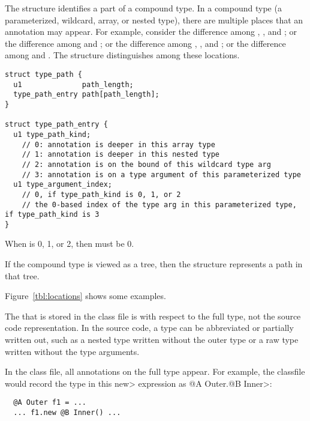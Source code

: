\documentclass[10pt]{article}
\newcommand{\preverbnegspace}{\vspace{-5pt}}
\begin{document}
The  structure identifies a part of a compound type.
In a compound type (a parameterized, wildcard, array, or nested type),
there are multiple places that an annotation may appear.
For example, consider the difference among
,
, and
;
or the difference among
 and
;
or the difference among 
,
, and
;
or the difference among 
 and
.
The  structure distinguishes among these locations.

\begin{Verbatim}
struct type_path {
  u1              path_length;
  type_path_entry path[path_length];
}

struct type_path_entry {
  u1 type_path_kind;
    // 0: annotation is deeper in this array type
    // 1: annotation is deeper in this nested type
    // 2: annotation is on the bound of this wildcard type arg
    // 3: annotation is on a type argument of this parameterized type
  u1 type_argument_index;
    // 0, if type_path_kind is 0, 1, or 2
    // the 0-based index of the type arg in this parameterized type, if type_path_kind is 3
}
\end{Verbatim}


When  is 0, 1, or 2, then
 must be 0.

If the compound type is viewed as a tree, then 
the  structure represents a path in that tree.

Figure~\ref{tbl:locations} shows some examples.

The  that is stored in the class file is with respect to the full type, not the
source code representation.  In the source code, a type can be abbreviated
or partially written out, such as a nested type written without the outer
type or a raw type written without the type arguments.

In the class file, all annotations on the full type appear.  For example,
the classfile would record the type in this \<new> expression as
\<@A Outer.@B Inner>:

\preverbnegspace
\begin{Verbatim}
  @A Outer f1 = ...
  ... f1.new @B Inner() ...
\end{Verbatim}
\end{document}
